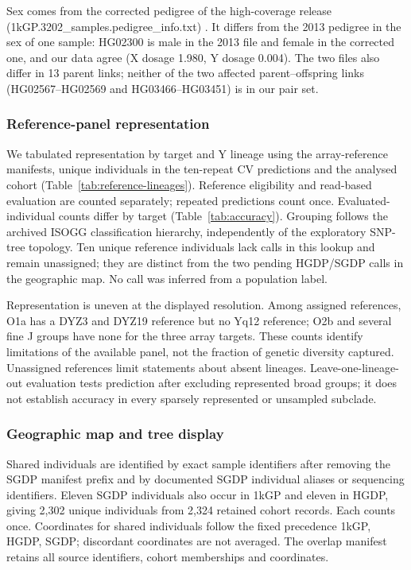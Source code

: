 Sex comes from the corrected pedigree of the high-coverage release (1kGP.3202\_samples.pedigree\_info.txt) \cite{ByrskaBishop2022}. It differs from the 2013 pedigree in the sex of one sample: HG02300 is male in the 2013 file and female in the corrected one, and our data agree (X dosage 1.980, Y dosage 0.004). The two files also differ in 13 parent links; neither of the two affected parent--offspring links (HG02567--HG02569 and HG03466--HG03451) is in our pair set.

\subsubsection{Reference-panel representation}
We tabulated representation by target and Y lineage using the array-reference manifests, unique individuals in the ten-repeat CV predictions and the analysed cohort (Table~\ref{tab:reference-lineages}). Reference eligibility and read-based evaluation are counted separately; repeated predictions count once. Evaluated-individual counts differ by target (Table~\ref{tab:accuracy}). Grouping follows the archived ISOGG classification hierarchy, independently of the exploratory SNP-tree topology. Ten unique reference individuals lack calls in this lookup and remain unassigned; they are distinct from the two pending HGDP/SGDP calls in the geographic map. No call was inferred from a population label.

Representation is uneven at the displayed resolution. Among assigned references, O1a has a DYZ3 and DYZ19 reference but no Yq12 reference; O2b and several fine J groups have none for the three array targets. These counts identify limitations of the available panel, not the fraction of genetic diversity captured. Unassigned references limit statements about absent lineages. Leave-one-lineage-out evaluation tests prediction after excluding represented broad groups; it does not establish accuracy in every sparsely represented or unsampled subclade.



\subsubsection{Geographic map and tree display}
Shared individuals are identified by exact sample identifiers after removing the SGDP manifest prefix and by documented SGDP individual aliases or sequencing identifiers. Eleven SGDP individuals also occur in 1kGP and eleven in HGDP, giving 2,302 unique individuals from 2,324 retained cohort records. Each counts once. Coordinates for shared individuals follow the fixed precedence 1kGP, HGDP, SGDP; discordant coordinates are not averaged. The overlap manifest retains all source identifiers, cohort memberships and coordinates.

